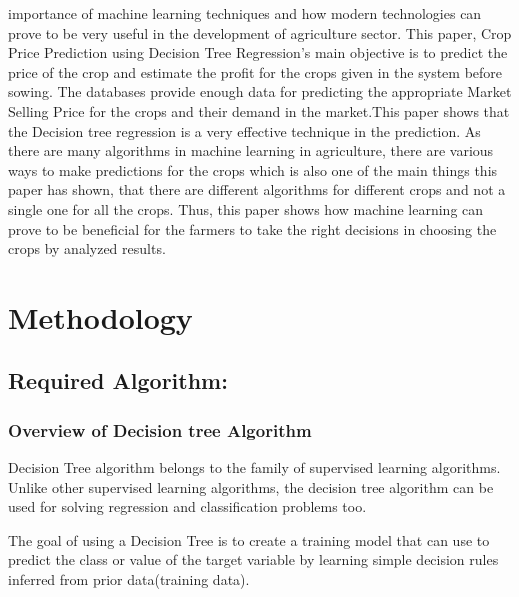 importance of machine learning techniques and how modern technologies can prove to 
be very useful in the development of agriculture sector. This paper, Crop Price 
Prediction using Decision Tree Regression’s main objective is 
to predict the price of the crop and estimate the profit for the crops given in 
the system before sowing. The databases provide enough data for predicting the 
appropriate Market Selling Price for the crops and their demand in the market.This paper shows that the 
Decision tree regression is a very effective technique in the prediction. As there are many 
algorithms in machine learning in agriculture, there are various ways to make 
predictions for the crops which is also one of the main things this paper has 
shown, that there are different algorithms for different crops and not a single 
one for all the crops. Thus, this paper shows how machine learning can prove to 
be beneficial for the farmers to take the 
right decisions in choosing the crops by analyzed results.\cite{rakhra2021crop}


\chapter{Methodology}

\section{Required Algorithm:}
\subsection{Overview of Decision tree Algorithm}
Decision Tree algorithm belongs to the family of supervised learning algorithms. Unlike other supervised learning algorithms, the decision tree algorithm can be used for solving regression and classification problems too.

The goal of using a Decision Tree is to create a training model that can use to predict the class or value of the target variable by learning simple decision rules inferred from prior data(training data).

